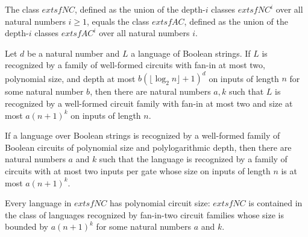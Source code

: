 \begin{theorem}
\label{BoolCircuit.NC_eq_AC}
\leanok
{}
The class $	extsf{NC}$, defined as the union of the depth-$i$ classes $	extsf{NC}^i$
over all natural numbers $i \ge 1$, equals the class $	extsf{AC}$, defined as the union
of the depth-$i$ classes $	extsf{AC}^i$ over all natural numbers $i$.
\end{theorem}

\begin{theorem}
\label{Language.InNC.inPPoly}
\leanok
{}
Let $d$ be a natural number and $L$ a language of Boolean strings. If $L$ is recognized
by a family of well-formed circuits with fan-in at most two, polynomial size, and depth
at most $b(\lfloor\log_2 n\rfloor+1)^d$ on inputs of length $n$ for some natural number
$b$, then there are natural numbers $a,k$ such that $L$ is recognized by a well-formed
circuit family with fan-in at most two and size at most $a(n+1)^k$ on inputs of length
$n$.
\end{theorem}

\begin{theorem}
\label{Language.InAC.inPPoly}
\leanok
{}
If a language over Boolean strings is recognized by a well-formed family of Boolean
circuits of polynomial size and polylogarithmic depth, then there are natural numbers
$a$ and $k$ such that the language is recognized by a family of circuits with at most
two inputs per gate whose size on inputs of length $n$ is at most $a(n+1)^k$.
\end{theorem}

\begin{theorem}
\label{BoolCircuit.NC_subset_PPoly}
\leanok
{}
Every language in $	extsf{NC}$ has polynomial circuit size: $	extsf{NC}$ is contained in
the class of languages recognized by fan-in-two circuit families whose size is bounded
by $a(n+1)^k$ for some natural numbers $a$ and $k$.
\end{theorem}
